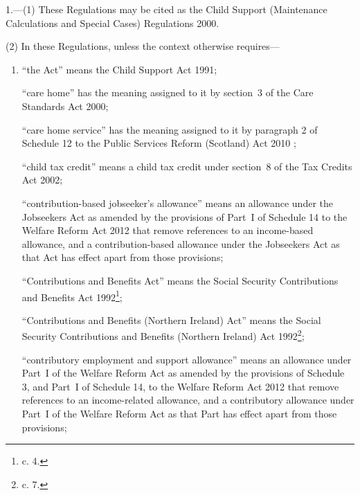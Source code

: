 \documentclass[12pt,a4paper]{article}
\begin{document}
1.---(1)  These Regulations may be cited as the Child Support (Maintenance Calculations and Special Cases) Regulations 2000.

(2) In these Regulations, unless the context otherwise requires—
\begin{enumerate}\item[]
“the Act” means the Child Support Act 1991;

“care home” has the meaning assigned to it by section~3 of the Care Standards Act 2000;

“care home service” has the meaning assigned to it by 
paragraph 2 of Schedule 12 to the Public Services Reform (Scotland) Act 2010%
;

“child tax credit” means a child tax credit under section~8 of the Tax Credits Act 2002;

“contribution-based jobseeker’s allowance” means an allowance under the Jobseekers Act as amended by the provisions of Part~I of Schedule 14 to the Welfare Reform Act 2012 that remove references to an income-based allowance, and a contribution-based allowance under the Jobseekers Act as that Act has effect apart from those provisions;

“Contributions and Benefits Act” means the Social Security Contributions and Benefits Act 1992\footnote{ c. 4.};

“Contributions and Benefits (Northern Ireland) Act” means the Social Security Contributions and Benefits (Northern Ireland) Act 1992\footnote{ c. 7.};

“contributory employment and support allowance” means an allowance under Part~I of the Welfare Reform Act as amended by the provisions of Schedule 3, and Part~I of Schedule 14, to the Welfare Reform Act 2012 that remove references to an income-related allowance, and a contributory allowance under Part~I of the Welfare Reform Act as that Part has effect apart from those provisions;

%


\end{enumerate}
\end{document}
